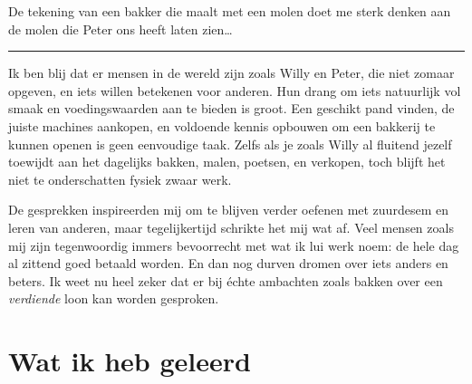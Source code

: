 \documentclass[
  11pt,
  dutch,
]{memoir}
\begin{document}
De tekening van een bakker die maalt met een molen doet me sterk denken
aan de molen die Peter ons heeft laten zien\ldots{}

\pfbreak

Ik ben blij dat er mensen in de wereld zijn zoals Willy en Peter, die
niet zomaar opgeven, en iets willen betekenen voor anderen. Hun drang om
iets natuurlijk vol smaak en voedingswaarden aan te bieden is groot. Een
geschikt pand vinden, de juiste machines aankopen, en voldoende kennis
opbouwen om een bakkerij te kunnen openen is geen eenvoudige taak. Zelfs
als je zoals Willy al fluitend jezelf toewijdt aan het dagelijks bakken,
malen, poetsen, en verkopen, toch blijft het niet te onderschatten
fysiek zwaar werk.

De gesprekken inspireerden mij om te blijven verder oefenen met
zuurdesem en leren van anderen, maar tegelijkertijd schrikte het mij wat
af. Veel mensen zoals mij zijn tegenwoordig immers bevoorrecht met wat
ik lui werk noem: de hele dag al zittend goed betaald worden. En dan nog
durven dromen over iets anders en beters. Ik weet nu heel zeker dat er
bij échte ambachten zoals bakken over een \emph{verdiende} loon kan
worden gesproken.

\newpage

\hypertarget{wat-ik-heb-geleerd-3}{%
\section{Wat ik heb geleerd}\label{wat-ik-heb-geleerd-3}}
\end{document}
